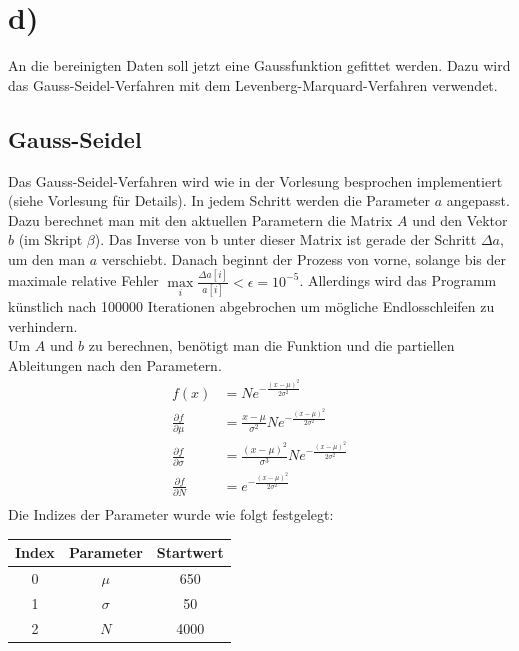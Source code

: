\documentclass{scrreprt}
\begin{document}
\section*{d)}
An die bereinigten Daten soll jetzt eine Gaussfunktion gefittet werden. Dazu wird das Gauss-Seidel-Verfahren mit dem Levenberg-Marquard-Verfahren verwendet.

\subsection*{Gauss-Seidel}
Das Gauss-Seidel-Verfahren wird wie in der Vorlesung besprochen implementiert (siehe Vorlesung für Details). In jedem Schritt werden die Parameter $a$ angepasst. Dazu berechnet man mit den aktuellen Parametern die Matrix $A$ und den Vektor $b$ (im Skript $\beta$).
Das Inverse von b unter dieser Matrix ist gerade der Schritt $\Delta a$, um den man $a$ verschiebt. Danach beginnt der Prozess von vorne, solange bis der maximale relative Fehler $\max\limits_i \frac{\Delta a[i]}{a[i]} < \epsilon = 10^{-5}$. Allerdings wird das Programm künstlich nach 100000 Iterationen abgebrochen um mögliche Endlosschleifen zu verhindern.\\

Um $A$ und $b$ zu berechnen, benötigt man die Funktion und die partiellen Ableitungen nach den Parametern.\\
\begin{align*}
f(x) &= Ne^{-\frac{(x-\mu)^2}{2\sigma^2}}\\
\frac{\partial f}{\partial \mu} &= \frac{x-\mu}{\sigma^2} Ne^{-\frac{(x-\mu)^2}{2\sigma^2}}\\
\frac{\partial f}{\partial \sigma} &= \frac{(x-\mu)^2}{\sigma^3} Ne^{-\frac{(x-\mu)^2}{2\sigma^2}}\\
\frac{\partial f}{\partial N} &= e^{-\frac{(x-\mu)^2}{2\sigma^2}}\\
\end{align*}
Die Indizes der Parameter wurde wie folgt festgelegt:\\
\begin{center}
\begin{tabular}{ccc}
\toprule
Index & Parameter & Startwert\\
\midrule
0 & $\mu$ & 650\\
1 & $\sigma$ & 50\\
2 & $N$ & 4000\\
\bottomrule
\end{tabular}
\end{center}
\end{document}
